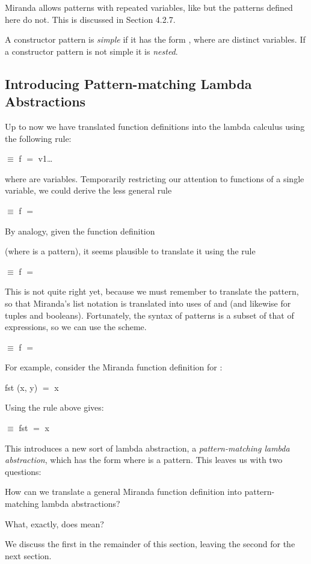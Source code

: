 Miranda allows patterns with repeated variables, like  but the patterns defined here do not. This is discussed in Section 4.2.7.

A constructor pattern is \textit{simple} if it has the form , where  are distinct variables. If a constructor pattern is not simple it is \textit{nested}.

\subsection{Introducing Pattern-matching Lambda Abstractions}

Up to now we have translated function definitions into the lambda calculus using the following rule:
\begin{mlcoded}
	   $\equiv$ f $=$ \tl{}v1\ldots{}
\end{mlcoded}
where  are variables. Temporarily restricting our attention to functions of a single variable, we could derive the less general rule
\begin{mlcoded}
	 $\equiv$ f $=$ 
\end{mlcoded}
By analogy, given the function definition
\begin{mlcoded}
\end{mlcoded}
(where  is a pattern), it seems plausible to translate it using the rule
\begin{mlcoded}
	 $\equiv$ f $=$ 
\end{mlcoded}

This is not quite right yet, because we must remember to translate the pattern, so that Miranda's list notation is translated into uses of  and  (and likewise for tuples and booleans). Fortunately, the syntax of patterns is a subset of that of expressions, so we can use the  scheme.
\begin{mlcoded}
	 $\equiv$ f $=$ 
\end{mlcoded}
For example, consider the Miranda function definition for :
\begin{mlcoded}
	fst (x, y) $=$ x
\end{mlcoded}
Using the rule above gives:
\begin{mlcoded}
	 $\equiv$ fst $=$ x
\end{mlcoded}
This introduces a new sort of lambda abstraction, a \textit{pattern-matching lambda abstraction}, which has the form  where  is a pattern. This leaves us with two questions:
\begin{numbered}
	\item How can we translate a general Miranda function definition into pattern-matching lambda abstractions?
	\item What, exactly, does  mean?
\end{numbered}
We discuss the first in the remainder of this section, leaving the second for the next section.


